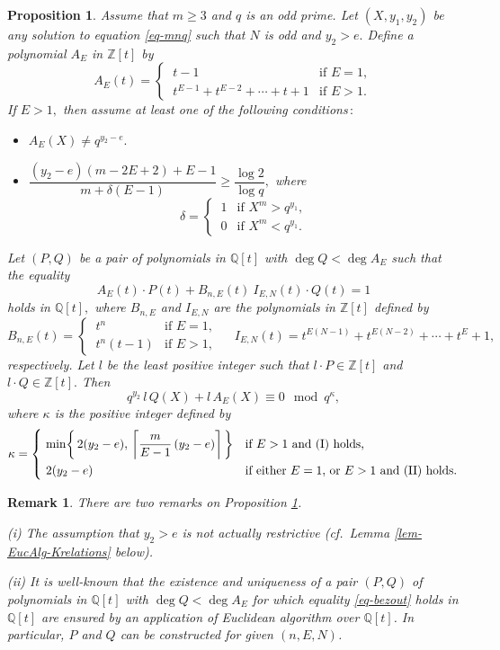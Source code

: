 \documentclass[11pt]{amsart}
\newtheorem{prop}{Proposition}[section]
\newtheorem{rem}{Remark}[section]
\numberwithin{equation}{section}
\begin{document}
\begin{prop}\label{prop-EuAl}
Assume that $m \ge 3$ and $q$ is an odd prime. 
Let $(X,y_1,y_2)$ be any solution to equation \eqref{eq-mnq} such that $N$ is odd and $y_2>e.$
Define a polynomial $A_{E}$ in $\mathbb Z[t]$ by
\[ A_{E}(t)=\begin{cases}
\ t-1 & \text{if $E=1,$}\\
\ t^{E-1}+t^{E-2}+ \cdots +t+1 & \text{if $E>1.$}
\end{cases}\]
If $E>1,$ then assume at least one of the following conditions\,$:$
\begin{itemize}
\item[(I)] $A_E(X) \ne q^{y_2-e}.$
\item[(II)] $\dfrac{(y_2-e)(m-2E+2)+E-1}{m+\delta(E-1)} \ge \dfrac{\log 2}{\log q},$ where
\[ 
\delta= 
\begin{cases}
\, 1 & \text{if $X^m>q^{y_1},$}\\
\, 0 & \text{if $X^m<q^{y_1}.$}
\end{cases}
\]
\end{itemize}
Let $(P,Q)$ be a pair of polynomials in $\mathbb Q[t]$ with $\deg Q<\deg A_E$ such that the equality
\begin{equation}\label{eq-bezout}
A_E(t) \cdot P(t) + B_{n,E}(t) \ I_{E,N}(t) \cdot Q(t) = 1
\end{equation}
holds in $\mathbb Q[t],$ where $B_{n,E}$ and $I_{E,N}$ are the polynomials in $\mathbb Z[t]$ defined by
\[ B_{n,E}(t)=\begin{cases}
\ t^n & \text{if $E=1,$}\\
\ t^n(t-1) & \text{if $E>1,$}
\end{cases}
\quad \ I_{E,N}(t)=t^{E(N-1)}+t^{E(N-2)}+ \cdots + t^E +1,
\]
respectively.
Let $l$ be the least positive integer such that $l \cdot P \in \mathbb Z[t]$ and $l \cdot Q \in \mathbb Z[t].$
Then 
\[
q^{y_2}\,l\,Q(X)+l\,A_E(X) \equiv 0 \mod{q^\kappa},
\]
where $\kappa$ is the positive integer defined by
\[
\kappa=
\begin{dcases}
\ \min\biggr\{\,2(y_2-e),\,\bigg\lceil \frac{m}{E-1}\,(y_2-e) \bigg\rceil \,\biggr\} & \text{if $E>1$ and {\rm (I)} holds,}\\
\ 2(y_2-e) & \text{if either $E=1,$ or $E>1$ and {\rm (II)} holds.}
\end{dcases}
\]
\end{prop}

\begin{rem}\label{rem-EuAl} \rm 
There are two remarks on Proposition \ref{prop-EuAl}. \par
(i) The assumption that $y_2>e$ is not actually restrictive (cf.~Lemma \ref{lem-EucAlg-Krelations} below).\par 
(ii) It is well-known that the existence and uniqueness of a pair $(P, Q)$ of polynomials in $\mathbb Q[t]$ with $\deg Q<\deg A_E$ for which equality \eqref{eq-bezout} holds in $\mathbb Q[t]$ are ensured by an application of Euclidean algorithm over $\mathbb Q[t]$.
In particular, $P$ and $Q$ can be constructed for given $(n,E,N)$.
\end{rem}
\end{document}
